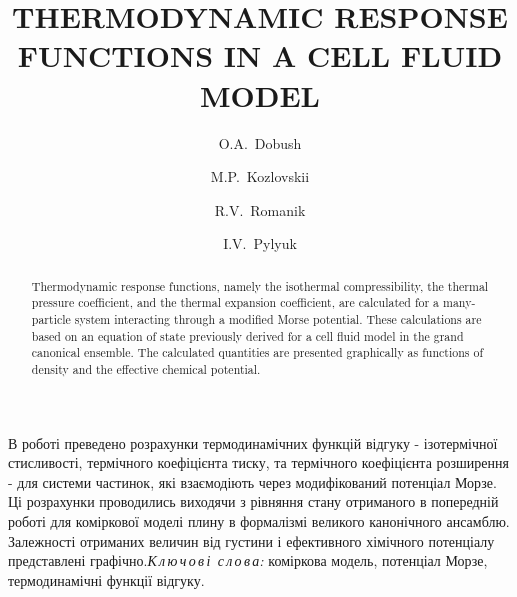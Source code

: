 \documentclass[fleqn,twoside,twocolumn,nofootinbib,showkeys]{revtex4} %
\begin{document}
	\title[Thermodynamic response functions in a cell fluid model]%
	{THERMODYNAMIC RESPONSE FUNCTIONS IN A CELL FLUID MODEL}%
	\author{O.A.~Dobush}%
	\author{M.P.~Kozlovskii}
	\author{R.V.~Romanik}
	\author{I.V.~Pylyuk}
	\address{1, Svientsitskii Str., Lviv 79011, Ukraine}%
	
	 \razd{\secv}
	
	
	\setcounter{page}{1}%
	
	\begin{abstract}
		Thermodynamic response functions, namely the isothermal compressibility, the thermal pressure coefficient, and the thermal expansion coefficient, are calculated for a many-particle system interacting through a modified Morse potential. These calculations are based on an equation of state previously derived for a cell fluid model in the grand canonical ensemble. The calculated quantities are presented graphically as functions of density and the effective chemical potential.
	\end{abstract}
	
	
	\maketitle
	
	
	
	
		
	\vspace*{-5mm} {В роботі преведено розрахунки термодинамічних функцій відгуку - ізотермічної стисливості, термічного коефіцієнта тиску, та термічного коефіцієнта розширення - для системи частинок, які взаємодіють через модифікований потенціал Морзе. Ці розрахунки проводились виходячи з рівняння стану отриманого в попередній роботі для коміркової моделі плину в формалізмі великого канонічного ансамблю. Залежності отриманих величин від густини і ефективного хімічного потенціалу представлені графічно.}{\textit{К\,л\,ю\,ч\,о\,в\,і\,
			с\,л\,о\,в\,а:} коміркова модель, потенціал Морзе, термодинамічні функції відгуку.}
	
\end{document}
